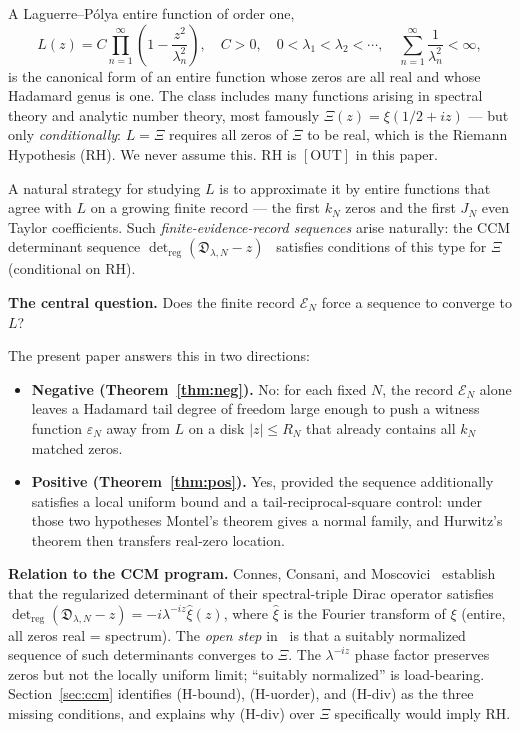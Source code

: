 \documentclass[12pt]{amsart}
\theoremstyle{definition}
\theoremstyle{remark}
\theoremstyle{plain}
\begin{document}
A Laguerre--P\'olya entire function of order one,
\begin{equation}
  \label{eq:LP}
  L(z) = C\prod_{n=1}^{\infty}\!\left(1-\frac{z^2}{\lambda_n^2}\right),
  \quad C>0,\quad 0<\lambda_1<\lambda_2<\cdots,\quad
  \sum_{n=1}^{\infty}\frac{1}{\lambda_n^2}<\infty,
\end{equation}
is the canonical form of an entire function whose zeros are all real and whose
Hadamard genus is one.  The class includes many functions arising in spectral
theory and analytic number theory, most famously $\Xi(z)=\xi(1/2+iz)$
--- but only \emph{conditionally}: $L=\Xi$ requires all zeros of $\Xi$ to be
real, which is the Riemann Hypothesis (RH).  We never assume this.  RH is
$[\mathrm{OUT}]$ in this paper.

A natural strategy for studying $L$ is to approximate it by entire functions
that agree with $L$ on a growing finite record --- the first $k_N$ zeros and
the first $J_N$ even Taylor coefficients.  Such \emph{finite-evidence-record
sequences} arise naturally: the CCM determinant sequence $\det_{\mathrm{reg}}
(\mathfrak{D}_{\lambda,N}-z)$~\cite{CCM2025} satisfies conditions of this
type for $\Xi$ (conditional on RH).

\medskip
\noindent\textbf{The central question.}
Does the finite record $\mathcal{E}_N$ force a sequence to converge to $L$?

The present paper answers this in two directions:

\begin{itemize}
\item \textbf{Negative (Theorem~\ref{thm:neg}).}  No: for each fixed $N$,
  the record $\mathcal{E}_N$ alone leaves a Hadamard tail degree of freedom
  large enough to push a witness function $\varepsilon_N$ away from $L$ on a
  disk $|z|\leq R_N$ that already contains all $k_N$ matched zeros.

\item \textbf{Positive (Theorem~\ref{thm:pos}).}  Yes, provided the sequence
  additionally satisfies a local uniform bound and a tail-reciprocal-square
  control: under those two hypotheses Montel's theorem gives a normal family,
  and Hurwitz's theorem then transfers real-zero location.
\end{itemize}

\medskip
\noindent\textbf{Relation to the CCM program.}
Connes, Consani, and Moscovici~\cite{CCM2025} establish that the regularized
determinant of their spectral-triple Dirac operator satisfies
$\det_{\mathrm{reg}}(\mathfrak{D}_{\lambda,N}-z)=-i\lambda^{-iz}\hat{\xi}(z)$,
where $\hat{\xi}$ is the Fourier transform of $\xi$ (entire, all zeros real =
spectrum).  The \emph{open step} in~\cite{CCM2025} is that a suitably
normalized sequence of such determinants converges to $\Xi$.  The
$\lambda^{-iz}$ phase factor preserves zeros but not the locally uniform
limit; ``suitably normalized'' is load-bearing.  Section~\ref{sec:ccm}
identifies (H-bound), (H-uorder), and (H-div) as the three missing
conditions, and explains why (H-div) over $\Xi$ specifically would imply RH.
\end{document}

